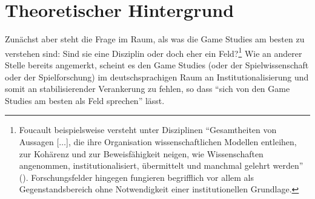 \documentclass{scrartcl}
\begin{document}
\section{Theoretischer Hintergrund}\label{sec:hintergrund}
Zunächst aber steht die Frage im Raum, als was die Game Studies am besten zu verstehen sind:
Sind sie eine Disziplin oder doch eher ein Feld?\footnote{Foucault beispielsweise versteht unter Disziplinen \enquote{Gesamtheiten von Aussagen [$\ldots$], die ihre Organisation wissenschaftlichen Modellen entleihen, zur Kohärenz und zur Beweisfähigkeit neigen, wie Wissenschaften angenommen, institutionalisiert, übermittelt und manchmal gelehrt werden} (\autocite[][S.~253--254]{foucault_archaologie_2011}). Forschungsfelder hingegen fungieren begrifflich vor allem als Gegenstandsbereich ohne Notwendigkeit einer institutionellen Grundlage.}
Wie an anderer Stelle bereits angemerkt, scheint es den Game Studies (oder der Spielwissenschaft oder der Spielforschung) im deutschsprachigen Raum an Institutionalisierung und somit an stabilisierender Verankerung zu fehlen, so dass \enquote{sich von den Game Studies am besten als Feld sprechen} lässt.
\end{document}
